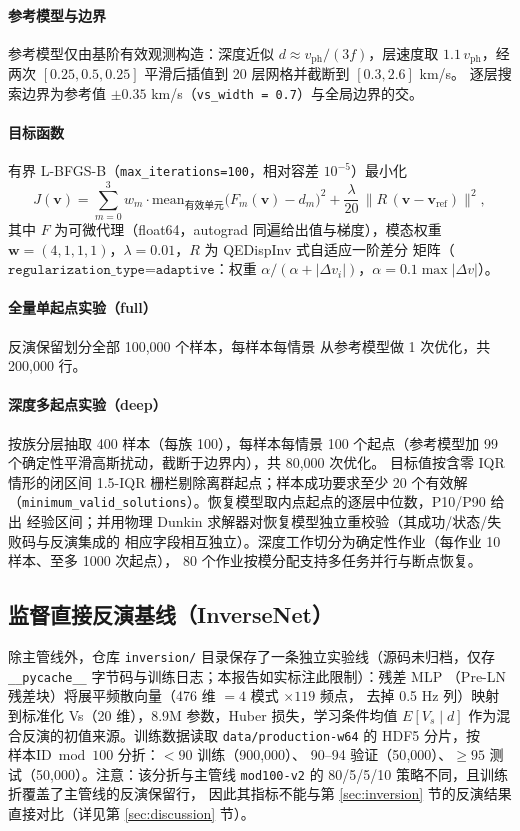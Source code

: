 \documentclass[UTF8,a4paper,11pt]{ctexart}
\begin{document}
\paragraph{参考模型与边界} 参考模型仅由基阶有效观测构造：深度近似
\(d \approx v_{\text{ph}}/(3f)\)，层速度取 \(1.1\,v_{\text{ph}}\)，经两次
\([0.25,0.5,0.25]\) 平滑后插值到 20 层网格并截断到 \([0.3,2.6]\) km/s。
逐层搜索边界为参考值 \(\pm 0.35\) km/s（\texttt{vs\_width = 0.7}）与全局边界的交。

\paragraph{目标函数} 有界 L-BFGS-B（\texttt{max\_iterations=100}，相对容差
\(10^{-5}\)）最小化
\begin{equation}
J(\mathbf{v}) = \sum_{m=0}^{3} w_m \cdot \mathrm{mean}_{\text{有效单元}}
\big(F_m(\mathbf{v}) - d_m\big)^2
+ \frac{\lambda}{20}\,\big\| R\,(\mathbf{v}-\mathbf{v}_{\text{ref}})\big\|^2 ,
\end{equation}
其中 \(F\) 为可微代理（float64，autograd 同遍给出值与梯度），模态权重
\(\mathbf{w}=(4,1,1,1)\)，\(\lambda=0.01\)，\(R\) 为 QEDispInv 式自适应一阶差分
矩阵（\(\texttt{regularization\_type=adaptive}\)：权重
\(\alpha/(\alpha+|\Delta v_i|)\)，\(\alpha=0.1\max|\Delta v|\)）。

\paragraph{全量单起点实验（full）} 反演保留划分全部 100{,}000 个样本，每样本每情景
从参考模型做 1 次优化，共 200{,}000 行。

\paragraph{深度多起点实验（deep）} 按族分层抽取 400 样本（每族 100），每样本每情景
100 个起点（参考模型加 99 个确定性平滑高斯扰动，截断于边界内），共 80{,}000 次优化。
目标值按含零 IQR 情形的闭区间 1.5-IQR 栅栏剔除离群起点；样本成功要求至少 20 个有效解
（\texttt{minimum\_valid\_solutions}）。恢复模型取内点起点的逐层中位数，P10/P90 给出
经验区间；并用物理 Dunkin 求解器对恢复模型独立重校验（其成功/状态/失败码与反演集成的
相应字段相互独立）。深度工作切分为确定性作业（每作业 10 样本、至多 1000 次起点），
80 个作业按模分配支持多任务并行与断点恢复。

\subsection{监督直接反演基线（InverseNet）}
除主管线外，仓库 \texttt{inversion/} 目录保存了一条独立实验线（源码未归档，仅存
\texttt{\_\_pycache\_\_} 字节码与训练日志；本报告如实标注此限制）：残差 MLP
（Pre-LN 残差块）将展平频散向量（476 维 \(=4\) 模式 \(\times 119\) 频点，
去掉 0.5 Hz 列）映射到标准化 Vs（20 维），8.9M 参数，Huber 损失，学习条件均值
\(E[V_s\mid d]\) 作为混合反演的初值来源。训练数据读取 \texttt{data/production-w64}
的 HDF5 分片，按 \(\text{样本ID}\bmod 100\) 分折：\(<90\) 训练（900{,}000）、
90--94 验证（50{,}000）、\(\geq95\) 测试（50{,}000）。注意：该分折与主管线
\texttt{mod100-v2} 的 80/5/5/10 策略不同，且训练折覆盖了主管线的反演保留行，
因此其指标不能与第 \ref{sec:inversion} 节的反演结果直接对比（详见第
\ref{sec:discussion} 节）。
\end{document}
